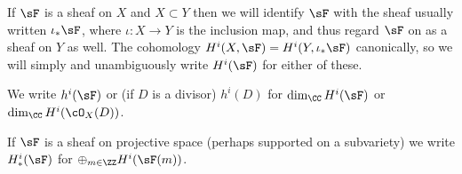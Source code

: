 If $\sF$ is a sheaf on $X$ and $X\subset Y$ then we will identify $\sF$ with
the sheaf usually written $\iota_*\sF$, where $\iota:X\to Y$ is the inclusion map,
 and thus regard $\sF$ on as a sheaf on $Y$ as well.
The cohomology  $H^i(X, \sF) = H^i(Y,\iota_*\sF)$ canonically, so we will
simply and unambiguously write $H^i(\sF)$ for either of these. 

We write $h^i(\sF)$ or (if $D$ is a divisor) $h^{i}(D)$ for 
$\dim_{\CC}H^i(\sF)$ or $\dim_{\CC}H^i(\cO_X(D))$. 

If $\sF$ is a sheaf on projective space (perhaps supported on a subvariety) we write $H^i_*(\sF)$ for
$\oplus_{m\in \ZZ} H^i(\sF(m))$. 





%
%
%




